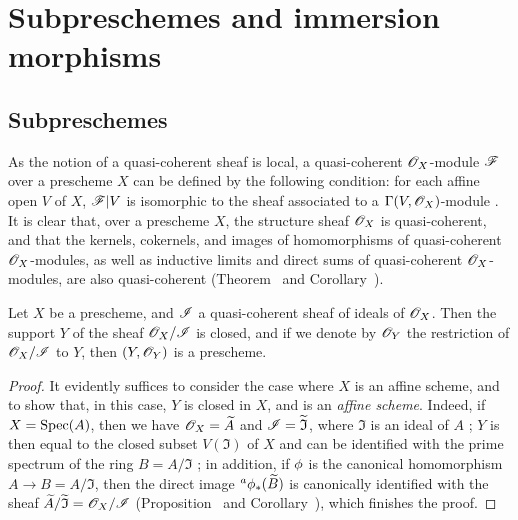 \section{Subpreschemes and immersion morphisms}
\label{section:I.4}

\subsection{Subpreschemes}
\label{subsection:I.4.1}

\begin{env}[4.1.1]
\label{I.4.1.1}
As the notion of a quasi-coherent sheaf  is local, a quasi-coherent $\mathscr{O}_X$-module $\mathscr{F}$ over a prescheme $X$ can be defined by the following condition: for each affine open $V$ of $X$, $\mathscr{F}|V$ is isomorphic to the sheaf associated to a $\Gamma(V,\mathscr{O}_X)$-module .
It is clear that, over a prescheme $X$, the structure sheaf $\mathscr{O}_X$ is quasi-coherent, and that the kernels, cokernels, and images of homomorphisms of quasi-coherent $\mathscr{O}_X$-modules, as well as inductive limits and direct sums of quasi-coherent $\mathscr{O}_X$-modules, are also quasi-coherent (Theorem~ and Corollary~).
\end{env}

\begin{proposition}[4.1.2]
\label{I.4.1.2}
Let $X$ be a prescheme, and $\mathscr{I}$ a quasi-coherent sheaf of ideals of $\mathscr{O}_X$.
Then the support $Y$ of the sheaf $\mathscr{O}_X/\mathscr{I}$ is closed, and if we denote by $\mathscr{O}_Y$ the restriction of $\mathscr{O}_X/\mathscr{I}$ to $Y$, then $(Y,\mathscr{O}_Y)$ is a prescheme.
\end{proposition}

\begin{proof}
\label{proof-1.4.1.2}
It evidently suffices  to consider the case where $X$ is an affine scheme, and to show that, in this case, $Y$ is closed in $X$, and is an \emph{affine scheme}.
Indeed, if $X=\operatorname{Spec}(A)$, then we have $\mathscr{O}_X=\widetilde{A}$ and $\mathscr{I}=\widetilde{\mathfrak{I}}$, where $\mathfrak{I}$ is an ideal of $A$ ;
$Y$ is then equal to the closed subset $V(\mathfrak{I})$ of $X$ and can be identified with the prime spectrum of the ring $B=A/\mathfrak{I}$ ;
in addition, if $\phi$ is the canonical homomorphism $A\to B=A/\mathfrak{I}$, then the direct image ${}^a\phi_*(\widetilde{B})$ is canonically identified with the sheaf $\widetilde{A}/\widetilde{\mathfrak{I}}=\mathscr{O}_X/\mathscr{I}$ (Proposition~ and Corollary~), which finishes the proof.
\end{proof}

